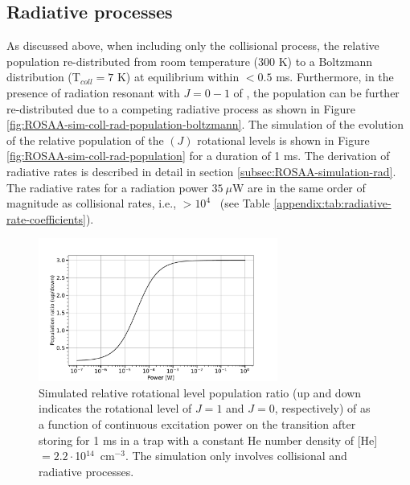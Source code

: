 \clearpage

\subsection{Radiative processes}
\label{subsec:CD+-kinetics-simulation-coll-rad}

As discussed above, when including only the collisional process, the relative
population re-distributed from room temperature (300 K) to a Boltzmann
distribution (T$_{coll}=7$ K) at equilibrium within $<0.5$ ms. Furthermore, in
the presence of radiation resonant with $J=0-1$ of \CD, the population can be
further re-distributed due to a competing radiative process as shown in Figure
\ref{fig:ROSAA-sim-coll-rad-population-boltzmann}. The simulation of the
evolution of the relative population of the \CD$(J)$ rotational levels is shown
in Figure \ref{fig:ROSAA-sim-coll-rad-population} for a duration of 1 ms. The
derivation of radiative rates is described in detail in section
\ref{subsec:ROSAA-simulation-rad}. The radiative rates for a radiation power $35\ \mu$W are
in the same order of magnitude as collisional rates, i.e., $>10^{4}$ \pers\
(see Table \ref{appendix:tab:radiative-rate-coefficients}).



\begin{figure}[!htb]
    \centering
    \includegraphics[width=0.7\textwidth]{figures/measurements/kinetics/CD+_power_saturation_up_down.pdf}
    \caption{
        Simulated relative rotational level population ratio (up and down indicates the rotational level 
        of $J=1$ and $J=0$, respectively) of \CD as a function of continuous excitation 
        power on the \CDline transition after storing for 1 ms in a trap with a constant 
        He number density of [He]$= 2.2\cdot$10$^{14}$~cm$^{-3}$. 
        The simulation only involves collisional and radiative processes.
    }
    \label{fig:pop_ratio_vs_power}
\end{figure}


